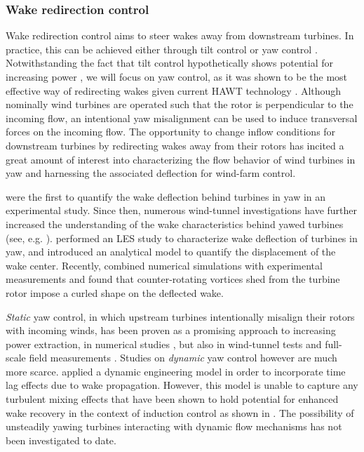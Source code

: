 \subsubsection{Wake redirection control}
Wake redirection control aims to steer wakes away from downstream turbines. In practice, this can be achieved either through tilt control or yaw control \citep{fleming2014evaluating}. Notwithstanding the fact that tilt control hypothetically shows potential for increasing power \citep{fleming2015simulation,verhulst2015altering}, we will focus on yaw control, as it was shown to be the most effective way of redirecting wakes given current HAWT technology \citep{fleming2014evaluating}. Although nominally wind turbines are operated such that the rotor is perpendicular to the incoming flow, an intentional yaw misalignment can be used to induce transversal forces on the incoming flow. The opportunity to change inflow conditions for downstream turbines by redirecting wakes away from their rotors has incited a great amount of interest into characterizing the flow behavior of wind turbines in yaw and harnessing the associated deflection for wind-farm control. 

\cite{clayton1982measured} were the first to quantify the wake deflection behind turbines in yaw in an experimental study. Since then, numerous wind-tunnel investigations have further increased the understanding of the wake characteristics behind yawed turbines (see, e.g. \citealp{grant1997optical, medici2008measurements, bastankhah2016experimental}). \cite{jimenez2010application} performed an LES study to characterize wake deflection of turbines in yaw, and introduced an analytical model to quantify the displacement of the wake center. Recently, \cite{howland2016wake} combined numerical simulations with experimental measurements and found that counter-rotating vortices shed from the turbine rotor impose a curled shape on the deflected wake. 

\emph{Static} yaw control, in which upstream turbines intentionally misalign their rotors with incoming winds, has been proven as a promising approach to increasing power extraction, in numerical studies \citep{gebraad2016wind, quick2017optimization}, but also in wind-tunnel tests \citep{campagnolo2016wind2,park2017data} and full-scale field measurements \citep{soleimanzadeh2014state, fleming2017field}. Studies on \emph{dynamic} yaw control however are much more scarce. \cite{gebraad2015wind} applied a dynamic engineering model in order to incorporate time lag effects due to wake propagation. However, this model is unable to capture any turbulent mixing effects that have been shown to hold potential for enhanced wake recovery in the context of induction control as shown in \cite{goit2015optimal}. The possibility of unsteadily yawing turbines interacting with dynamic flow mechanisms has not been investigated to date. 

